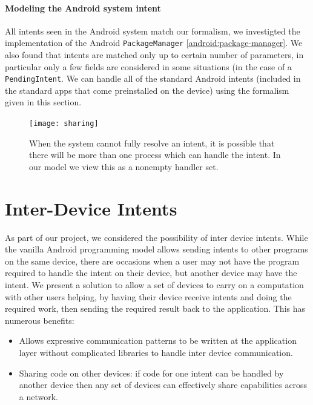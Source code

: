 \documentclass{acm_proc_article-sp}
\begin{document}
\paragraph*{Modeling the Android system intent}\label{section:intents-model}
All intents seen in the Android system match our formalism, we
investigted the implementation of the Android \texttt{PackageManager}
\ref{android:package-manager}.  We also found that intents are matched
only up to certain number of parameters, in particular only a few
fields are considered in some situations (in the case of a
\texttt{PendingIntent}.  We can handle all of the standard Android
intents (included in the standard apps that come preinstalled on the
device) using the formalism given in this section.

\begin{figure}[t]
  \label{fig:multiple-intents}
  \centering
    \texttt{[image: sharing]}
    \caption{When the system cannot fully resolve an intent, it is
      possible that there will be more than one process which can
      handle the intent.  In our model we view this as a nonempty
      handler set.}
\end{figure}

\section{Inter-Device Intents}

As part of our project, we considered the possibility of inter device
intents.  While the vanilla Android programming model allows sending
intents to other programs on the same device, there are occasions when
a user may not have the program required to handle the intent on their
device, but another device may have the intent.  We present a solution
to allow a set of devices to carry on a computation with other users
helping, by having their device receive intents and doing the required
work, then sending the required result back to the application.  This
has numerous benefits:

\begin{itemize}
\item Allows expressive communication patterns to be written at the
  application layer without complicated libraries to handle inter
  device communication.
\item Sharing code on other devices: if code for one intent
  can be handled by another device then any set of devices can
  effectively share capabilities across a network.
\end{itemize}
\end{document}

